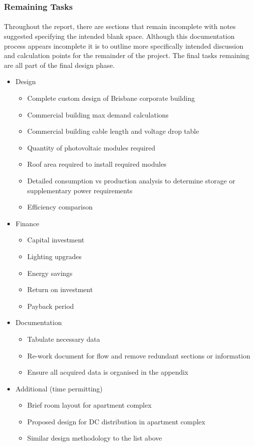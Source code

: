 \subsubsection{Remaining Tasks} \label{section:remaining-tasks}

\paragraph{}
Throughout the report, there are sections that remain incomplete with notes suggested specifying the intended blank space. Although this documentation process appears incomplete it is to outline more specifically intended discussion and calculation points for the remainder of the project. The final tasks remaining are all part of the final design phase.

\begin{itemize}
	\item Design
	\begin{itemize}
		\item Complete custom design of Brisbane corporate building
		\item Commercial building max demand calculations
		\item Commercial building cable length and voltage drop table
		\item Quantity of photovoltaic modules required
		\item Roof area required to install required modules
		\item Detailed consumption vs production analysis to determine storage or supplementary power requirements
		\item Efficiency comparison
	\end{itemize}

	\item Finance
	\begin{itemize}
		\item Capital investment
		\item Lighting upgrades
		\item Energy savings
		\item Return on investment
		\item Payback period
	\end{itemize}

	\item Documentation
	\begin{itemize}
		\item Tabulate necessary data
		\item Re-work document for flow and remove redundant sections or information
		\item Ensure all acquired data is organised in the appendix
	\end{itemize}

	\item Additional (time permitting)
	\begin{itemize}
		\item Brief room layout for apartment complex
		\item Proposed design for DC distribution in apartment complex
		\item Similar design methodology to the list above
	\end{itemize}
\end{itemize}        
  
